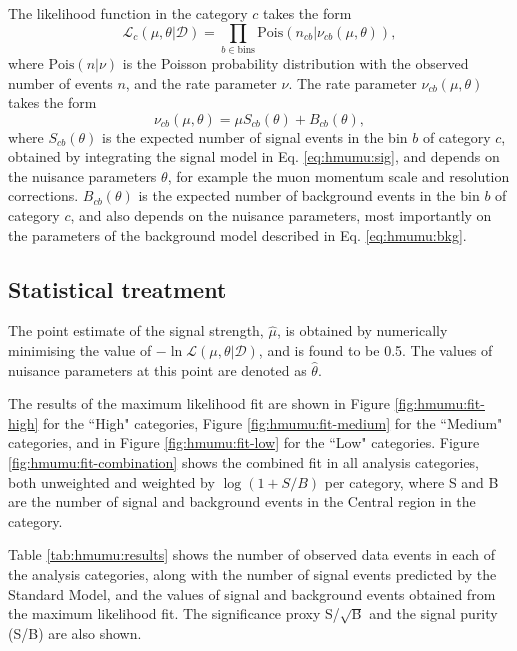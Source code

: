 The likelihood function in the category $c$ takes the form
\begin{equation}
\mathcal{L}_c (\mu, \theta | \mathcal{D}) =
\prod_{b \in \text{bins}} \text{Pois}(n_{cb} | \nu_{cb} (\mu, \theta)),
\end{equation}
where $\text{Pois}(n | \nu)$ is the Poisson probability distribution
with the observed number of events $n$, and the rate parameter $\nu$.
The rate parameter $\nu_{cb}(\mu, \theta)$ takes the form
\begin{equation}
\nu_{cb}(\mu, \theta) = \mu S_{cb}(\theta) + B_{cb}(\theta),
\end{equation}
where $S_{cb}(\theta)$ is the expected number of signal events in
the bin $b$ of category $c$, obtained by integrating the signal
model in Eq. \ref{eq:hmumu:sig}, and depends on the nuisance
parameters $\theta$, for example the muon momentum scale
and resolution corrections. $B_{cb}(\theta)$ is the expected
number of background events in the bin $b$ of category $c$, and
also depends on the nuisance parameters, most importantly on the
parameters of the background model described in Eq. \ref{eq:hmumu:bkg}.

\subsection{Statistical treatment}

The point estimate of the signal strength, $\hat\mu$, is obtained
by numerically minimising the value of $-\ln{\mathcal{L}}(\mu, \theta | \mathcal{D})$,
and is found to be 0.5. The values of nuisance parameters at this
point are denoted as $\hat\theta$.

The results of the maximum likelihood fit are shown in Figure
\ref{fig:hmumu:fit-high} for the ``High" categories, Figure
\ref{fig:hmumu:fit-medium} for the ``Medium" categories,
and in Figure \ref{fig:hmumu:fit-low} for the ``Low" categories.
Figure \ref{fig:hmumu:fit-combination} shows the combined fit in
all analysis categories, both unweighted and weighted by
$\log(1+S/B)$ per category, where S and B are the number of signal
and background events in the Central region in the category.

Table \ref{tab:hmumu:results} shows the number of observed data events
in each of the analysis categories, along with the number of signal events
predicted by the Standard Model, and the values of signal and background
events obtained from the maximum likelihood fit. The significance proxy
S/$\sqrt{\text{B}}$ and the signal purity (S/B) are also shown.

